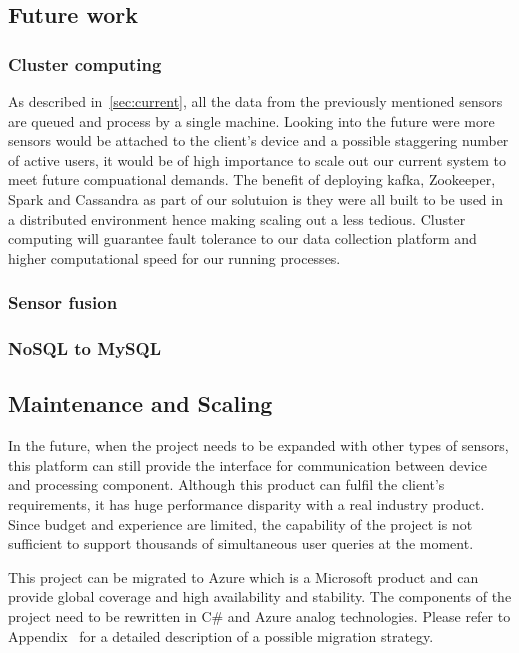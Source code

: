 \documentclass[prodmode,acmtosem]{acmsmall} %
\begin{document}
\subsection{Future work}

\subsubsection{Cluster computing}
As described in~\ref{sec:current}, all the data from the previously mentioned sensors are queued and process by a single machine. Looking into the future were more sensors would be attached to the client's device and a possible staggering number of active users, it would be of high importance to scale out our current system to meet future compuational demands. The benefit of deploying kafka, Zookeeper, Spark and Cassandra as part of our solutuion is they were all built to be used in a distributed environment hence making scaling out a less tedious. Cluster computing will guarantee fault tolerance to our data collection platform and higher computational speed for our running processes.

\subsubsection{Sensor fusion}

\subsubsection{NoSQL to MySQL}

\subsection{Maintenance and Scaling}
In the future, when the project needs to be expanded with other types of sensors, this platform can still provide the interface for communication between device and processing component. 
Although this product can fulfil the client's requirements, it has huge performance disparity with a real industry product. Since budget and experience are limited, the capability of the project is not sufficient to support thousands of simultaneous user queries at the moment.

This project can be migrated to Azure which is a Microsoft product and can provide global coverage and high availability and stability. The components of the project need to be rewritten in C\# and Azure analog technologies. Please refer to Appendix~\cite{app:MigrationPlan} for a detailed description of a possible migration strategy.
\end{document}
